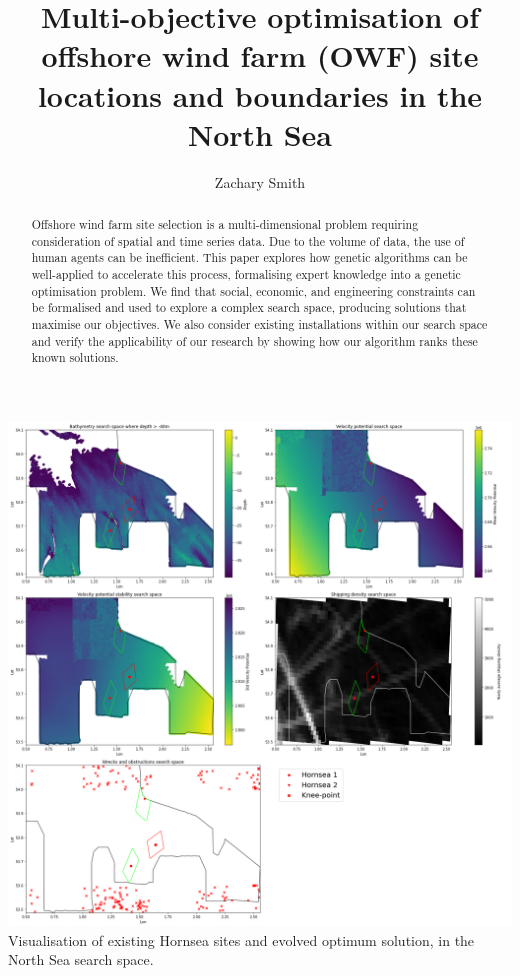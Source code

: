 \documentclass[preprint,12pt]{elsarticle}
\begin{document}
\begin{frontmatter}


\title{Multi-objective optimisation of offshore wind farm (OWF) site locations and boundaries in the North Sea}

\author{Zachary Smith}

\begin{abstract}
Offshore wind farm site selection is a multi-dimensional problem requiring consideration of spatial and time series data. Due to the volume of data, the use of human agents can be inefficient. This paper explores how genetic algorithms can be well-applied to accelerate this process, formalising expert knowledge into a genetic optimisation problem. We find that social, economic, and engineering constraints can be formalised and used to explore a complex search space, producing solutions that maximise our objectives. We also consider existing installations within our search space and verify the applicability of our research by showing how our algorithm ranks these known solutions.

\end{abstract}

\begin{graphicalabstract}
\includegraphics[width=\textwidth,height=\textheight,keepaspectratio]{images/search_space_visualisations.png}
Visualisation of existing Hornsea sites and evolved optimum solution, in the North Sea search space.


\end{graphicalabstract}
\end{frontmatter}
\end{document}
